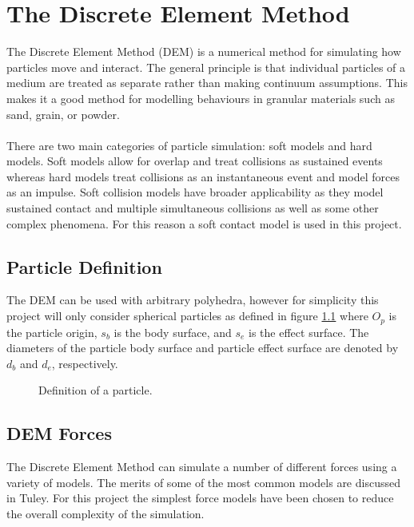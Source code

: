\documentclass[10pt,a4paper,titlepage]{report}
\begin{document}
\chapter{The Discrete Element Method}
\label{ch:The Discrete Element Method}
The Discrete Element Method (DEM) is a numerical method for simulating how particles move and interact. The general principle is that individual particles of a medium are treated as separate rather than making continuum assumptions. This makes it a good method for modelling behaviours in granular materials such as sand, grain, or powder. 
\\\\There are two main categories of particle simulation: soft models and hard models. Soft models allow for overlap and treat collisions as sustained events whereas hard models treat collisions as an instantaneous event and model forces as an impulse. Soft collision models have broader applicability as they model sustained contact and multiple simultaneous collisions as well as some other complex phenomena\cite{softvshard}. For this reason a soft contact model is used in this project.
\section{Particle Definition}
The DEM can be used with arbitrary polyhedra, however for simplicity this project will only consider spherical particles as defined in figure \ref{fig:particle} where $O_p$ is the particle origin, $s_b$ is the body surface, and $s_e$ is the effect surface. The diameters of the particle body surface and particle effect surface are denoted by $d_b$ and $d_e$, respectively.
\begin{figure}[!ht]
\centering

\caption{Definition of a particle.}
\label{fig:particle}
\end{figure}
\section{DEM Forces}
\label{sec:DEM Forces}
The Discrete Element Method can simulate a number of different forces using a variety of models. The merits of some of the most common models are discussed in Tuley\cite{tuley}. For this project the simplest force models have been chosen to reduce the overall complexity of the simulation.
\end{document}

